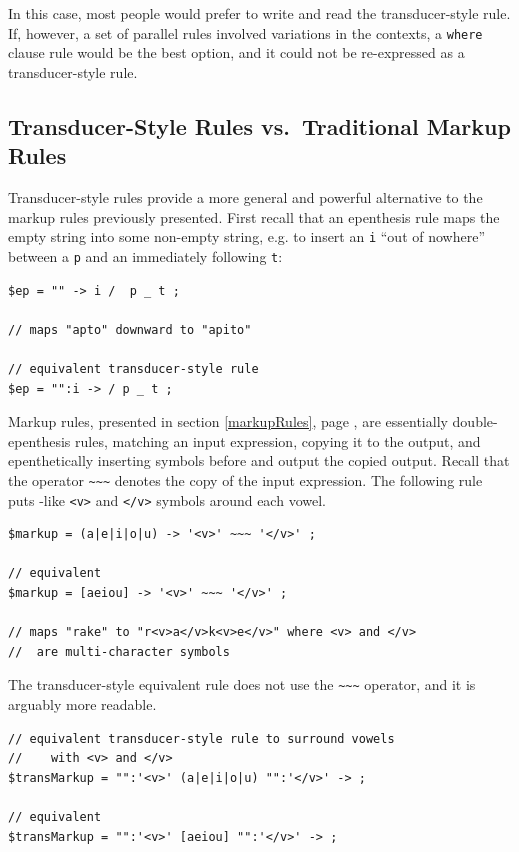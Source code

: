 \noindent
In this case, most people would prefer to write and read the transducer-style
rule.  If, however,
a set of parallel rules involved variations in the contexts, a 
\texttt{where} clause rule would be the 
best option, and it could not be re-expressed as a transducer-style rule.


\subsection{Transducer-Style Rules vs.\ Traditional Markup Rules}

Transducer-style rules provide a more general and powerful alternative to the markup rules
previously presented.  First
recall that an epenthesis rule maps the empty string into some non-empty string, e.g. to
insert an \verb!i! ``out of nowhere'' between a \verb!p! and an immediately following
\verb!t!:

\begin{Verbatim}
$ep = "" -> i /  p _ t ;

// maps "apto" downward to "apito"

// equivalent transducer-style rule
$ep = "":i -> / p _ t ;
\end{Verbatim}


Markup rules, presented in section \ref{markupRules}, page \pageref{markupRules}, are essentially double-epenthesis
rules, matching an input expression, copying it to the output, and epenthetically inserting
symbols before and output the copied output.  Recall that the operator \verb!~~~! denotes the
copy of the input expression.  The following rule puts -like \verb!<v>! and
\verb!</v>! symbols around each vowel.

\begin{Verbatim}
$markup = (a|e|i|o|u) -> '<v>' ~~~ '</v>' ;

// equivalent
$markup = [aeiou] -> '<v>' ~~~ '</v>' ;

// maps "rake" to "r<v>a</v>k<v>e</v>" where <v> and </v>
//	are multi-character symbols
\end{Verbatim}

The transducer-style equivalent rule does not use the \verb!~~~! operator, and it is arguably
more readable.

\begin{Verbatim}
// equivalent transducer-style rule to surround vowels 
//    with <v> and </v>
$transMarkup = "":'<v>' (a|e|i|o|u) "":'</v>' -> ;

// equivalent
$transMarkup = "":'<v>' [aeiou] "":'</v>' -> ;
\end{Verbatim}

